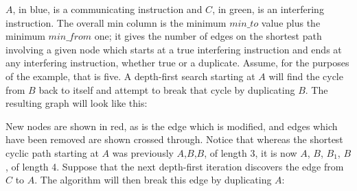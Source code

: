 
$A$, in blue, is a communicating instruction and $C$, in green, is an
interfering instruction.  The overall min column is the minimum
$\mathit{min\_to}$ value plus the minimum $\mathit{min\_from}$ one; it
gives the number of edges on the shortest path involving a given node
which starts at a true interfering instruction and ends at any
interfering instruction, whether true or a duplicate.  Assume, for the
purposes of the example, that \backref{$\alpha$} is five.  A
depth-first search starting at $A$ will find the cycle from $B$ back
to itself and attempt to break that cycle by duplicating $B$.  The
resulting graph will look like this:


New nodes are shown in red, as is the edge which is modified, and
edges which have been removed are shown crossed through.  Notice that
whereas the shortest cyclic path starting at $A$ was previously
$A$,$B$,$B$, of length 3, it is now $A$, $B$, $B_1$, $B$, of length 4.
Suppose that the next depth-first iteration discovers the edge from
$C$ to $A$.  The algorithm will then break this edge by duplicating
$A$:

